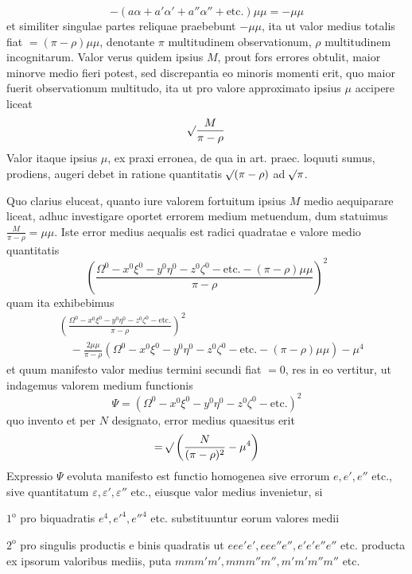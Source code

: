 \[
-(a\alpha+a'\alpha'+a''\alpha''+\text{etc.})\mu\mu=-\mu\mu
\]
%
et similiter singulae partes reliquae praebebunt \(-\mu\mu\), ita ut valor medius totalis fiat \(=(\pi-\rho)\mu\mu\), denotante \(\pi\) multitudinem observationum, \(\rho\) multitudinem incognitarum. Valor verus quidem ipsius \(M\), prout fors errores obtulit, maior minorve medio fieri potest, sed discrepantia eo minoris momenti erit, quo maior fuerit observationum multitudo, ita ut pro valore approximato ipsius \(\mu\) accipere liceat
\[
\mathord{{}^{}\!\surd}\frac{M}{\pi-\rho}
\]
Valor itaque ipsius \(\mu\), ex praxi erronea, de qua in art. praec. loquuti sumus, prodiens, augeri debet in ratione quantitatis \(\mathord{{}^{}\!\surd}(\pi-\rho)\) ad \(\mathord{{}^{}\!\surd}\pi\).

Quo clarius eluceat, quanto iure valorem fortuitum ipsius \(M\) medio aequiparare liceat, adhuc investigare oportet errorem medium metuendum, dum statuimus \(\frac{M}{\pi-\rho}=\mu\mu\). Iste error medius aequalis est radici quadratae e valore medio quantitatis
\[
\left(\frac{\Omega^0-x^0\xi^0-y^0\eta^0-z^0\zeta^0-\text{etc.}-(\pi-\rho)\mu\mu}{\pi-\rho}\right)^2
\]
quam ita exhibebimus
\[
\begin{aligned}
&\left(\frac{\Omega^0-x^0\xi^0-y^0\eta^0-z^0\zeta^0-\text{etc.}}{\pi-\rho}\right)^2\\[4pt]
&\quad-\frac{2\mu\mu}{\pi-\rho}(\Omega^0-x^0\xi^0-y^0\eta^0-z^0\zeta^0-\text{etc.}-(\pi-\rho)\mu\mu)-\mu^4
\end{aligned}
\]
et quum manifesto valor medius termini secundi fiat \(=0\), res in eo vertitur, ut indagemus valorem medium functionis
\[
\Psi=(\Omega^0-x^0\xi^0-y^0\eta^0-z^0\zeta^0-\text{etc.})^2
\]
quo invento et per \(N\) designato, error medius quaesitus erit
\[
=\mathord{{}^{}\!\surd}\left(\frac{N}{(\pi-\rho)^2}-\mu^4\right)
\]
Expressio \(\Psi\) evoluta manifesto est functio homogenea sive errorum \(e,e',e''\) etc., sive quantitatum \(\varepsilon,\varepsilon',\varepsilon''\) etc., eiusque valor medius invenietur, si

\(1^\mathrm{o}\) pro biquadratis \(e^4,e'^4,e''^4\) etc. substituuntur eorum valores medii

\(2^\mathrm{o}\) pro singulis productis e binis quadratis ut \(eee'e',\allowbreak eee''e'',\allowbreak e'e'e''e''\) etc. producta ex ipsorum valoribus mediis, puta \(mmm'm',\allowbreak mmm''m'',\allowbreak m'm'm''m''\) etc.
